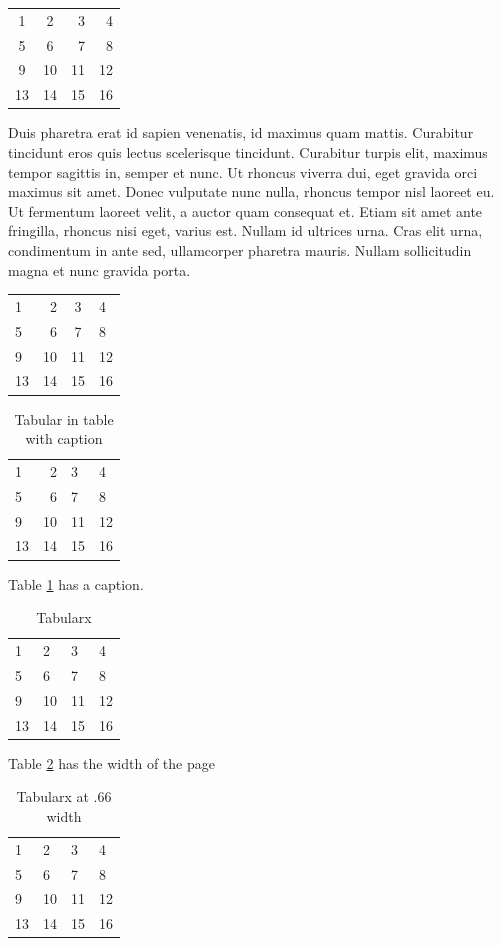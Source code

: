 \documentclass{scrartcl}
\begin{document}
\begin{tabular}{ccrr}
 1&2&3&4\\
 5&6&7&8\\
 9&10&11&12\\
 13&14&15&16
\end{tabular}

Duis pharetra erat id sapien venenatis, id maximus quam mattis. Curabitur tincidunt eros quis lectus scelerisque tincidunt. Curabitur turpis elit, maximus tempor sagittis in, semper et nunc. Ut rhoncus viverra dui, eget gravida orci maximus sit amet. Donec vulputate nunc nulla, rhoncus tempor nisl laoreet eu. Ut fermentum laoreet velit, a auctor quam consequat et. Etiam sit amet ante fringilla, rhoncus nisi eget, varius est. Nullam id ultrices urna. Cras elit urna, condimentum in ante sed, ullamcorper pharetra mauris. Nullam sollicitudin magna et nunc gravida porta. 

\begin{tabular}{p{5cm}rcl}
 1&2&3&4\\
 5&6&7&8\\
 9&10&11&12\\
 13&14&15&16
\end{tabular}

\begin{table}
\begin{tabular}{p{2cm}rp{2cm}l}
 1&2&3&4\\
 5&6&7&8\\
 9&10&11&12\\
 13&14&15&16
\end{tabular}
\caption{Tabular in table with caption}
\label{tab:intro}
\end{table}

Table \ref{tab:intro} has a caption.


\begin{table}
\begin{tabularx}{\textwidth}{XXXX}
 1&2&3&4\\
 5&6&7&8\\
 9&10&11&12\\
 13&14&15&16
\end{tabularx}
\caption{Tabularx}
\label{tab:tabularx}
\end{table}

Table \ref{tab:tabularx} has the width of the page

\begin{table}
\begin{tabularx}{\textwidth}{XXXX}
 1&2&3&4\\
 5&6&7&8\\
 9&10&11&12\\
 13&14&15&16
\end{tabularx}
\caption{Tabularx at .66 width}
\label{tab:tabularx66}
\end{table}
\end{document}
